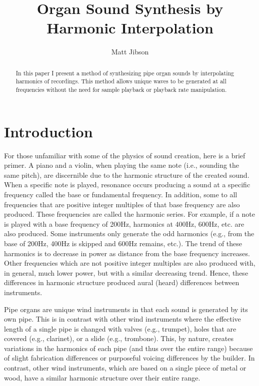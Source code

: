 \documentclass[twocolumn]{article}
\begin{document}
\title{Organ Sound Synthesis by Harmonic Interpolation}
\author{Matt Jibson}

\maketitle{}

\begin{abstract}

In this paper I present a method of synthesizing pipe organ sounds by interpolating harmonics of recordings. This method allows unique waves to be generated at all frequencies without the need for sample playback or playback rate manipulation.

\end{abstract}

\section{Introduction}

For those unfamiliar with some of the physics of sound creation, here is a brief primer. A piano and a violin, when playing the same note (i.e., sounding the same pitch), are discernible due to the harmonic structure of the created sound. When a specific note is played, resonance occurs producing a sound at a specific frequency called the base or fundamental frequency. In addition, some to all frequencies that are positive integer multiples of that base frequency are also produced. These frequencies are called the harmonic series. For example, if a note is played with a base frequency of 200Hz, harmonics at 400Hz, 600Hz, etc. are also produced. Some instruments only generate the odd harmonics (e.g., from the base of 200Hz, 400Hz is skipped and 600Hz remains, etc.). The trend of these harmonics is to decrease in power as distance from the base frequency increases. Other frequencies which are not positive integer multiples are also produced with, in general, much lower power, but with a similar decreasing trend. Hence, these differences in harmonic structure produced aural (heard) differences between instruments.

Pipe organs are unique wind instruments in that each sound is generated by its own pipe. This is in contrast with other wind instruments where the effective length of a single pipe is changed with valves (e.g., trumpet), holes that are covered (e.g., clarinet), or a slide (e.g., trombone). This, by nature, creates variations in the harmonics of each pipe (and thus over the entire range) because of slight fabrication differences or purposeful voicing differences by the builder. In contrast, other wind instruments, which are based on a single piece of metal or wood, have a similar harmonic structure over their entire range.
\end{document}
